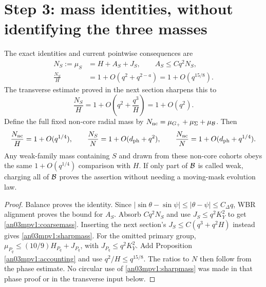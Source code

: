 \documentclass[11pt]{article}
\numberwithin{equation}{section}
\theoremstyle{remark}\newtheorem{remark}[theorem]{Remark}
\newcommand{\Gp}{{G_+}}\newcommand{\Clk}{\mathcal C_q}
\begin{document}
\section{Step 3: mass identities, without identifying the three masses}
\begin{proposition}
\label{an03mpv1:masses}
The exact identities and current pointwise consequences are
\begin{align}
 N_S:=\mu_S&=H+A_S+J_S,\qquad A_S\le Cq^2N_S,
 \label{an03mpv1:identity}\\
 \frac{N_S}{H}&=1+O(q^2+q^{2-a})=1+O(q^{15/8}).
 \label{an03mpv1:coarsemass}
\end{align}
The transverse estimate proved in the next section sharpens this to
\begin{equation}
 \frac{N_S}{H}=1+O\left(q^2+\frac{q^3}{H}\right)=1+O(q^2).
 \label{an03mpv1:sharpmass}
\end{equation}
Define the full fixed non-core radial mass by
$N_{\rm nc}=\mu_\Gp+\mu_\Sigma+\mu_\BB$. Then
\begin{equation}
 \frac{N_{\rm nc}}H=1+O(q^{1/4}),\qquad
 \frac{N_S}N=1+O(d_{\rm ph}+q^2),\qquad
 \frac{N_{\rm nc}}N=1+O(d_{\rm ph}+q^{1/4}).
 \label{an03mpv1:totalmass}
\end{equation}
Any weak-family mass containing $S$ and drawn from these non-core
cohorts obeys the same $1+O(q^{1/4})$ comparison with $H$.
If only part of $\mathcal B$ is called weak, charging all of $\mathcal B$ proves
the assertion without needing a moving-mask evolution law.
\end{proposition}
\begin{proof}
Balance proves the identity. Since $|\sin\theta-\sin\psi|
\le|\theta-\psi|\le C_\Delta q$, WBR alignment proves the bound
for $A_S$. Absorb $Cq^2N_S$ and use $J_S\le q^2K_Y^2$
to get \eqref{an03mpv1:coarsemass}. Inserting the next section's
$J_S\le C(q^3+q^2H)$ instead gives \eqref{an03mpv1:sharpmass}.
For the omitted primary group,
$\mu_{P_q}\le(10/9)H_{P_q}+J_{P_q}$, with
$J_{P_q}\le q^2K_Y^2$. Add Proposition
\ref{an03mpv1:accounting} and use $q^2/H\le q^{15/8}$.
The ratios to $N$ then follow from the phase estimate.
No circular use of \eqref{an03mpv1:sharpmass} was made in that
phase proof or in the transverse input below.
\end{proof}
\end{document}
